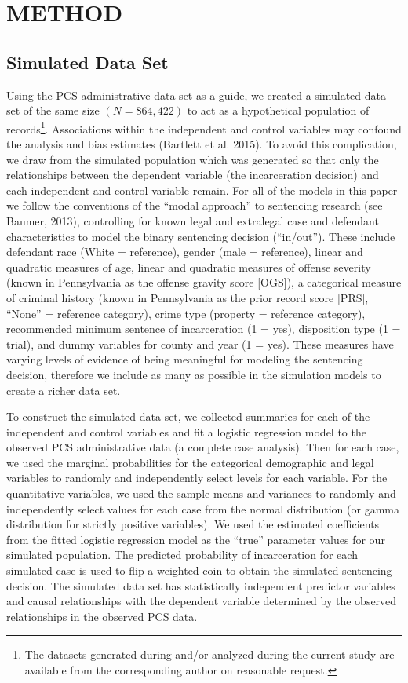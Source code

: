 \documentclass[titlepage]{article}
\begin{document}
\section{METHOD}

\subsection{Simulated Data Set}

Using the PCS administrative data set as a guide, we created a simulated data set of the same size \((N = 864,422)\) to act as a hypothetical population of records\footnote{The datasets generated during and/or analyzed during the current study are available from the corresponding author on reasonable request.}. Associations within the independent and control variables may confound the analysis and bias estimates (Bartlett et al. 2015). To avoid this complication, we draw from the simulated population which was generated so that only the relationships between the dependent variable (the incarceration decision) and each independent and control variable remain. For all of the models in this paper we follow the conventions of the “modal approach” to sentencing research (see Baumer, 2013), controlling for known legal and extralegal case and defendant characteristics to model the binary sentencing decision (“in/out”). These include defendant race (White = reference), gender (male = reference), linear and quadratic measures of age, linear and quadratic measures of offense severity (known in Pennsylvania as the offense gravity score [OGS]), a categorical measure of criminal history (known in Pennsylvania as the prior record score [PRS], “None” = reference category), crime type (property = reference category), recommended minimum sentence of incarceration (1 = yes), disposition type (1 = trial), and dummy variables for county and year (1 = yes). These measures have varying levels of evidence of being meaningful for modeling the sentencing decision, therefore we include as many as possible in the simulation models to create a richer data set.

To construct the simulated data set, we collected summaries for each of the independent and control variables and fit a logistic regression model to the observed PCS administrative data (a complete case analysis). Then for each case, we used the marginal probabilities for the categorical demographic and legal variables to randomly and independently select levels for each variable. For the quantitative variables, we used the sample means and variances to randomly and independently select values for each case from the normal distribution (or gamma distribution for strictly positive variables). We used the estimated coefficients from the fitted logistic regression model as the “true” parameter values for our simulated population. The predicted probability of incarceration for each simulated case is used to flip a weighted coin to obtain the simulated sentencing decision. The simulated data set has statistically independent predictor variables and causal relationships with the dependent variable determined by the observed relationships in the observed PCS data.
\end{document}
